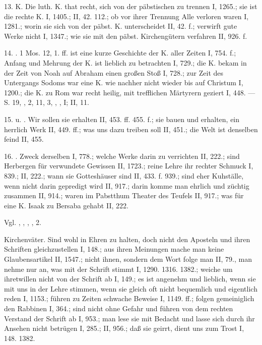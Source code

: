 13.  K. Die luth. K. that recht, sich von der päbstischen zu trennen I, 1265.; sie ist die rechte K. I, 1405.; II, 42. 112.; ob vor ihrer Trennung Alle verloren waren I, 1281.; worin sie sich von der päbst. K. unterscheidet II, 42. f.; verwirft gute Werke nicht I, 1347.; wie sie mit den päbst. Kirchengütern verfahren II, 926. f.

14. . 1 Mos. 12, 1. ff. ist eine kurze Geschichte der K. aller Zeiten I, 754. f.; Anfang und Mehrung der K. ist lieblich zu betrachten I, 729.; die K. bekam in der Zeit von Noah auf Abraham einen großen
Stoß I, 728.; zur Zeit des Untergangs Sodoms war eine K. wie nachher nicht wieder bis auf Christum I, 1200.; die K. zu Rom war recht heilig, mit trefflichen Märtyrern geziert I, 448. — S.  19, ,  2,  11,  3, , ,  I; II, 11.

15.  u. . Wir sollen sie erhalten II, 453. ff. 455. f.; sie bauen und erhalten, ein herrlich Werk II, 449. ff.; was uns dazu treiben soll II, 451.; die Welt ist denselben feind II, 455.

16. . Zweck derselben I, 778.; welche Werke darin zu verrichten II, 222.; sind Herbergen für verwundete Gewissen II, 1723.; reine Lehre ihr rechter Schmuck I, 839.; II, 222.; wann sie Gotteshäuser sind II, 433. f. 939.; sind eher Kuhställe, wenn nicht darin gepredigt wird II, 917.; darin komme man ehrlich und züchtig zusammen II, 914.; waren im Pabstthum Theater des Teufels II, 917.; was für eine K. Isaak zu Bersaba gehabt II, 222.

Vgl. , , , ,  2.

Kirchenväter. Sind wohl in Ehren zu halten, doch nicht den Aposteln und ihren Schriften gleichzustellen I, 148.; aus ihren Meinungen mache man keine Glaubensartikel II, 1547.; nicht ihnen, sondern dem Wort folge man II, 79., man nehme nur an, was mit der Schrift stimmt I, 1290. 1316. 1382.; weiche um ihretwillen nicht von der Schrift ab I, 149.; es ist angenehm und lieblich, wenn sie mit uns in der Lehre stimmen, wenn sie gleich oft nicht bequemlich und eigentlich reden I, 1153.; führen zu Zeiten schwache Beweise I, 1149. ff.; folgen gemeiniglich den Rabbinen I, 364.; sind nicht ohne Gefahr und führen von dem rechten Verstand der Schrift ab I, 953.; man lese sie mit Bedacht und lasse sich durch ihr Ansehen nicht betrügen I, 285.; II, 956.; daß sie geirrt, dient uns zum Trost I, 148. 1382.

